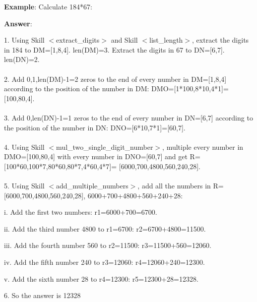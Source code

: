 \documentclass{article} %
\begin{document}
\newpage


\begin{tcolorbox}[title = {An Example of Skill Composition for Multiplication}, colback = Apricot!25!white, colframe = BrickRed!75!black] 
\textbf{Example}: Calculate 184*67: 

\quad

\textbf{Answer}:

1. Using Skill $<$extract\_digits$>$ and Skill $<$list\_length$>$, extract the digits in 184 to DM=[1,8,4].  len(DM)=3. Extract the digits in 67 to DN=[6,7]. len(DN)=2. \\ \\
2. Add 0,1,len(DM)-1=2 zeros to the end of every number in DM=[1,8,4] according to the position of the number in DM: DMO=[1*100,8*10,4*1]=[100,80,4]. \\ \\
3. Add 0,len(DN)-1=1 zeros to the end of every number in DN=[6,7] according to the position of the number in DN: DNO=[6*10,7*1]=[60,7]. \\ \\
4. Using Skill $<$mul\_two\_single\_digit\_number$>$, multiple every number in DMO=[100,80,4] with every number in DNO=[60,7] and get R=[100*60,100*7,80*60,80*7,4*60,4*7]= [6000,700,4800,560,240,28]. \\ \\
5. Using Skill $<$add\_multiple\_numbers$>$, add all the numbers in R=[6000,700,4800,560,240,28], 6000+700+4800+560+240+28:

\quad 

    \qquad i. Add the first two numbers: r1=6000+700=6700. 
    
    \qquad ii. Add the third number 4800 to r1=6700: r2=6700+4800=11500. 
    
    \qquad iii. Add the fourth number 560 to r2=11500: r3=11500+560=12060. 
    
    \qquad iv. Add the fifth number 240 to r3=12060: r4=12060+240=12300. 
    
    \qquad v. Add the sixth number 28 to r4=12300: r5=12300+28=12328. 

\quad
    
6. So the answer is 12328 
\end{tcolorbox}
\noindent\begin{minipage}{\textwidth} 
 \label{Tab:compose_simple_mul_skill}
\end{minipage}
\end{document}
